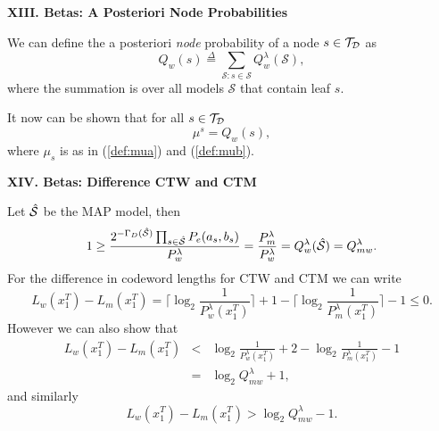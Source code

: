 \documentclass[a4paper,landscape]{slides} %
\newcommand{\hcS}{{\hat{\cal{S}}}}
\newcommand{\cS}{{\mathcal{S}}}
\newcommand{\define}{\stackrel{\Delta}{=}}
\newcommand{\xT}{x_{1}^{T}}
\newcommand{\cTD}{{\cal{T}_{D}}}
\newcommand{\GD}{{\Gamma_{D}}}
\begin{document}
\begin{slide}{\bf\Large\color{blue} XIII. Betas: A Posteriori Node Probabilities}

We can define the a posteriori {\em node} probability of a node $s \in \cTD$ as
\begin{equation*}
Q_w(s) \define \sum_{\cS: s\in\cS} Q_{w}^{\lambda}(\cS),
\end{equation*}
where the summation is over all models $\cS$ that contain leaf $s$.

It now can be shown that for all $s\in\cTD$
\begin{equation}
\mu^{s} = Q_{w}(s),
\end{equation}
where $\mu_s$ is as in (\ref{def:mua}) and (\ref{def:mub}).
\end{slide}
\begin{slide}{\bf\Large\color{blue} XIV. Betas: Difference CTW and CTM}

Let $\hcS$ be the MAP model, then
\begin{equation*}
1 \geq \frac{2^{-\GD(\hcS)} \prod_{s\in\hcS} P_e( a_s,b_s) }{ P_{w}^{\lambda} }
= \frac{P^{\lambda}_m}{P^{\lambda}_w} = Q_{w}^{\lambda}(\hcS) = Q^{\lambda}_{mw}.
\end{equation*}
For the difference in codeword lengths for CTW and CTM we can write
\begin{equation*}
L_w(\xT)-L_m(\xT)
=  \lceil \log_2\frac{1}{P^{\lambda}_w(\xT)}\rceil + 1 - \lceil\log_2\frac{1}{P_m^{\lambda}(\xT)}\rceil -1
\leq  0.
\end{equation*}
However we can also show that
\begin{eqnarray*}
L_w(\xT)-L_m(\xT)
&< & \log_2\frac{1}{P^{\lambda}_w(\xT)} + 2 - \log_2\frac{1}{P^{\lambda}_m(\xT)} - 1 \nonumber \\
&=& \log_2 Q_{mw}^{\lambda} + 1,
\end{eqnarray*}
and similarly
\begin{equation*}
L_w(\xT)-L_m(\xT) > \log_2 Q_{mw}^{\lambda} - 1.
\end{equation*}
\end{slide}
\end{document}
